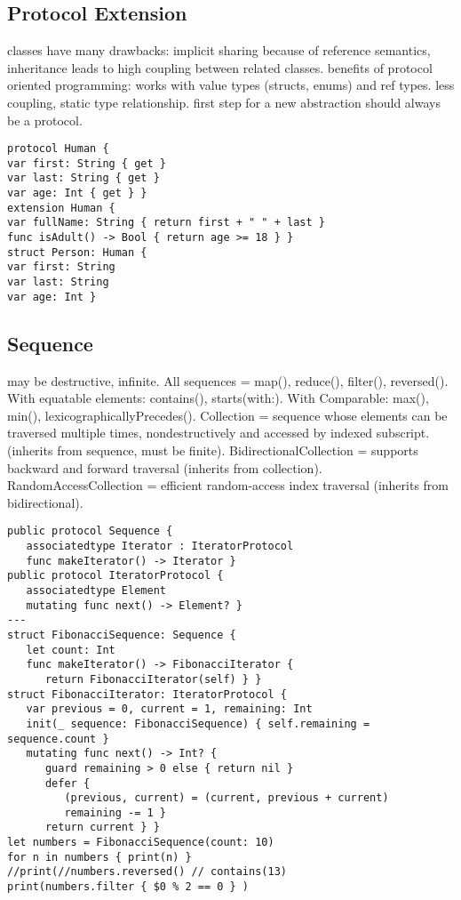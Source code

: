 \subsection{Protocol Extension}
classes have many drawbacks: implicit sharing because of reference semantics, inheritance leads to high coupling between related classes. benefits of protocol oriented programming: works with value types (structs, enums) and ref types. less coupling, static type relationship. first step for a new abstraction should always be a protocol.
\begin{lstlisting}
protocol Human {
var first: String { get }
var last: String { get }
var age: Int { get } }
extension Human {
var fullName: String { return first + " " + last }
func isAdult() -> Bool { return age >= 18 } }
struct Person: Human {
var first: String
var last: String
var age: Int }
\end{lstlisting}

\subsection{Sequence}
may be destructive, infinite. All sequences = map(), reduce(), filter(), reversed(). With equatable elements: contains(), starts(with:). With Comparable: max(), min(), lexicographicallyPrecedes(). Collection = sequence whose elements can be traversed multiple times, nondestructively and accessed by indexed subscript. (inherits from sequence, must be finite). BidirectionalCollection = supports backward and forward traversal (inherits from collection). RandomAccessCollection = efficient random-access index traversal (inherits from bidirectional).
\begin{lstlisting}
public protocol Sequence {
   associatedtype Iterator : IteratorProtocol
   func makeIterator() -> Iterator }
public protocol IteratorProtocol {
   associatedtype Element
   mutating func next() -> Element? }
---
struct FibonacciSequence: Sequence {
   let count: Int
   func makeIterator() -> FibonacciIterator {
      return FibonacciIterator(self) } }
struct FibonacciIterator: IteratorProtocol {
   var previous = 0, current = 1, remaining: Int
   init(_ sequence: FibonacciSequence) { self.remaining = sequence.count }
   mutating func next() -> Int? {
      guard remaining > 0 else { return nil }
      defer {
         (previous, current) = (current, previous + current)
         remaining -= 1 }
      return current } }
let numbers = FibonacciSequence(count: 10)
for n in numbers { print(n) }
//print(//numbers.reversed() // contains(13)
print(numbers.filter { $0 % 2 == 0 } )
\end{lstlisting}

